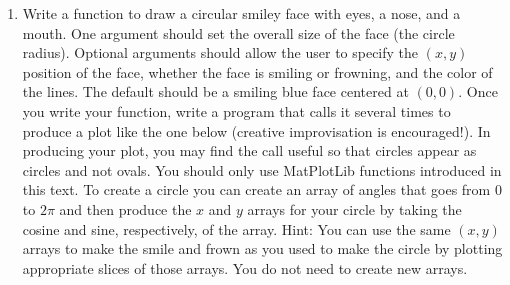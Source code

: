 \documentclass[letterpaper,10pt,english]{sphinxmanual}
\begin{document}
\begin{enumerate}
\item {} 
Write a function to draw a circular smiley face with eyes, a nose, and a mouth.  One argument should set the overall size of the face (the circle radius).  Optional arguments should allow the user to specify the \((x,y)\) position of the face, whether the face is smiling or frowning, and the color of the lines.  The default should be a smiling blue face centered at \((0,0)\).  Once you write your function, write a program that calls it several times to produce a plot like the one below (creative improvisation is encouraged!).  In producing your plot, you may find the call  useful so that circles appear as circles and not ovals.  You should only use MatPlotLib functions introduced in this text.  To create a circle you can create an array of angles that goes from 0 to \(2\pi\) and then produce the \(x\) and \(y\) arrays for your circle by taking the cosine and sine, respectively, of the array.  Hint: You can use the same \((x,y)\) arrays to make the smile and frown as you used to make the circle by plotting appropriate slices of those arrays.  You do not need to create new arrays.
\begin{figure}[htbp]
\centering

\label{chap7/chap7_funcs:fig-faces}\end{figure}


\end{enumerate}
\end{document}
